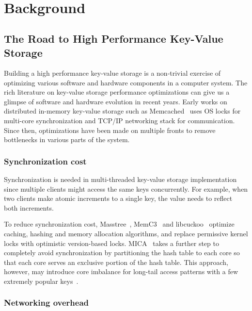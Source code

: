 \section{Background}
\label{kvdirect:sec:background}


\subsection{The Road to High Performance Key-Value Storage}

Building a high performance key-value storage is a non-trivial exercise of optimizing various software and hardware components in a computer system. The rich literature on key-value storage performance optimizations can give us a glimpse of software and hardware evolution in recent years.
Early works on distributed in-memory key-value storage such as Memcached~\cite{fitzpatrick2004distributed} uses OS locks for multi-core synchronization and TCP/IP networking stack for communication. Since then, optimizations have been made on multiple fronts to remove bottlenecks in various parts of the system.


\subsubsection{Synchronization cost}
\label{kvdirect:sec:CoreSynchronizationCost}
Synchronization is needed in multi-threaded key-value storage implementation since multiple clients might access the same keys concurrently. For example, when two clients make atomic increments to a single key, the value needs to reflect both increments.

To reduce synchronization cost, Masstree~\cite{mao2012cache}, MemC3~\cite{fan2013memc3} and libcuckoo~\cite{li2014algorithmic} optimize caching, hashing and memory allocation algorithms, and replace permissive kernel locks with optimistic version-based locks.
MICA~\cite{lim2014mica, li2016full} takes a further step to completely avoid synchronization by partitioning the hash table to each core so that each core serves an exclusive portion of the hash table.
This approach, however, may introduce core imbalance for long-tail access patterns with a few extremely popular keys~\cite{li2016full}.

\subsubsection{Networking overhead}
\label{kvdirect:sec:ReduceNetworkingOverhead}

